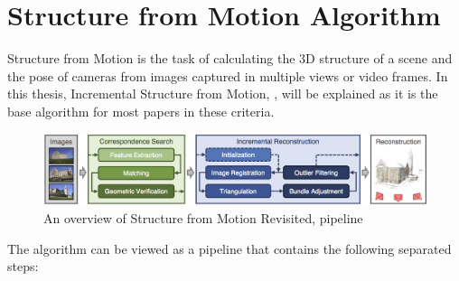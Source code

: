 \documentclass[11pt]{article}
\begin{document}
    \section{Structure from Motion Algorithm}
    Structure from Motion is the task of calculating the 3D structure of a scene and the pose of cameras from
    images captured in multiple views or video frames. In this thesis, Incremental Structure from Motion, \cite{7780814}, will be explained
    as it is the base algorithm for most papers in these criteria.

    \begin{figure}
    \centering
    \includegraphics[width=\textwidth,height=\textheight,keepaspectratio]{images/sfm.png}
    \caption{An overview of Structure from Motion Revisited, \cite{7780814} pipeline}
    \end{figure}

    The algorithm can be viewed as a pipeline that contains the following separated steps:
\end{document}
